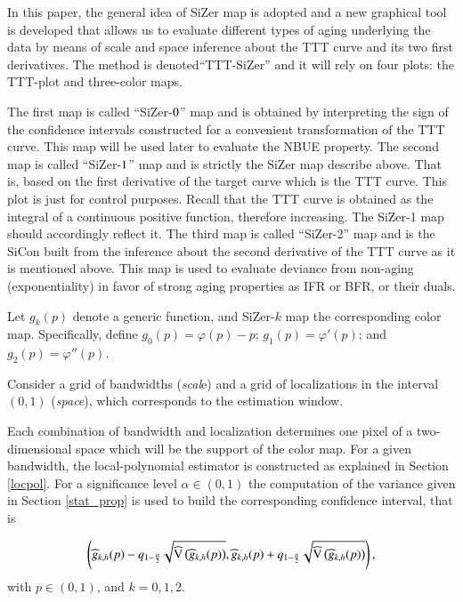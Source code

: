 \documentclass[preprint,12pt]{elsarticle}
\begin{document}
In this paper, the general idea of SiZer map is adopted and  a new graphical tool is developed that allows us to evaluate different types of aging underlying the data by means of scale and space inference about the TTT curve and its two first derivatives. The method is denoted``TTT-SiZer'' and it will rely on four plots: the TTT-plot and three-color maps.


The first map is called ``SiZer-${\rm 0}$'' map and is obtained by interpreting the sign of the confidence intervals constructed for a convenient transformation of the TTT curve. This map will be used later to evaluate the NBUE property.
The second map is called ``SiZer-${\rm 1}$'' map and is strictly the SiZer map describe above. That is, based on the first derivative of the target curve which is the TTT curve. This plot is just for control purposes. Recall that the TTT curve is obtained as the integral of a continuous positive function, therefore increasing. The  SiZer-1 map should accordingly reflect it. The third map is called ``SiZer-{\rm 2}'' map and is the  SiCon  built from the inference about the second derivative of the TTT curve as it is mentioned above. This map is used to evaluate deviance from non-aging (exponentiality) in favor of strong aging properties as IFR or BFR, or their duals.


Let $g_k(p)$ denote a generic function, and SiZer-${ k}$ map the corresponding color map. Specifically, define $g_0(p)=\varphi(p) - p$; $g_1(p)=\varphi'(p)$; and  $g_2(p)=\varphi''(p)$. 

Consider a grid of bandwidths (\textit{scal}e) and a grid of localizations in the interval $(0,1)$  (\textit{space}), which corresponds to the estimation window. 

Each combination of bandwidth and localization determines one pixel of a two-dimensional space which will be the support of the color map. For a given bandwidth, the local-polynomial estimator is constructed as explained in Section \ref{locpol}. For a significance level $\alpha \in (0,1)$ the computation of the variance given in Section \ref{stat_prop} is used to build the corresponding confidence interval, that is
 
\begin{equation}\label{ci1}
\left(\widehat{g}_{k,h}(p)-q_{1-\frac{\alpha}{2}}\sqrt{{\rm \widehat{V}}\left(\widehat{g}_{k,h}(p)\right)},\widehat{g}_{k,h}(p)+q_{1-\frac{\alpha}{2}}\sqrt{{\rm \widehat{V}}\left(\widehat{g}_{k,h}(p)\right)}\right),
\end{equation}
 with $p \in (0,1)$, and $k=0,1,2$.
\end{document}
